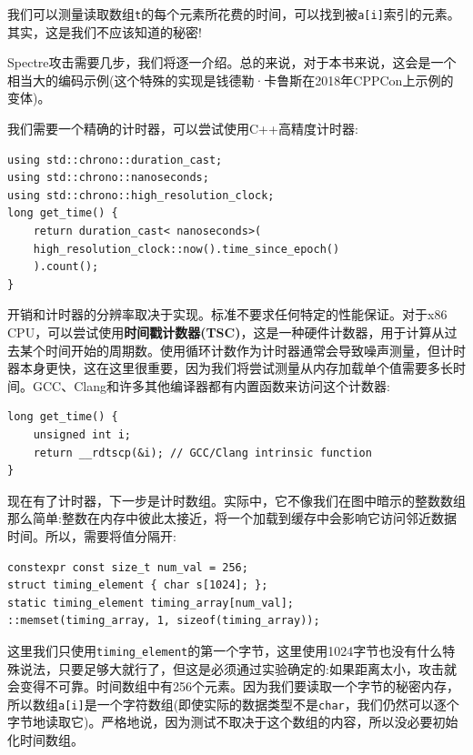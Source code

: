 我们可以测量读取数组\texttt{t}的每个元素所花费的时间，可以找到被\texttt{a[i]}索引的元素。其实，这是我们不应该知道的秘密!


Spectre攻击需要几步，我们将逐一介绍。总的来说，对于本书来说，这会是一个相当大的编码示例(这个特殊的实现是钱德勒·卡鲁斯在2018年CPPCon上示例的变体)。

我们需要一个精确的计时器，可以尝试使用C++高精度计时器:

\begin{lstlisting}[style=styleCXX]
using std::chrono::duration_cast;
using std::chrono::nanoseconds;
using std::chrono::high_resolution_clock;
long get_time() {
	return duration_cast< nanoseconds>(
	high_resolution_clock::now().time_since_epoch()
	).count();
}
\end{lstlisting}

开销和计时器的分辨率取决于实现。标准不要求任何特定的性能保证。对于x86 CPU，可以尝试使用\textbf{时间戳计数器(TSC)}，这是一种硬件计数器，用于计算从过去某个时间开始的周期数。使用循环计数作为计时器通常会导致噪声测量，但计时器本身更快，这在这里很重要，因为我们将尝试测量从内存加载单个值需要多长时间。GCC、Clang和许多其他编译器都有内置函数来访问这个计数器:

\begin{lstlisting}[style=styleCXX]
long get_time() {
	unsigned int i;
	return __rdtscp(&i); // GCC/Clang intrinsic function
}
\end{lstlisting}

现在有了计时器，下一步是计时数组。实际中，它不像我们在图中暗示的整数数组那么简单:整数在内存中彼此太接近，将一个加载到缓存中会影响它访问邻近数据时间。所以，需要将值分隔开:

\begin{lstlisting}[style=styleCXX]
constexpr const size_t num_val = 256;
struct timing_element { char s[1024]; };
static timing_element timing_array[num_val];
::memset(timing_array, 1, sizeof(timing_array));
\end{lstlisting}

这里我们只使用\texttt{timing\_element}的第一个字节，这里使用1024字节也没有什么特殊说法，只要足够大就行了，但这是必须通过实验确定的:如果距离太小，攻击就会变得不可靠。时间数组中有256个元素。因为我们要读取一个字节的秘密内存，所以数组\texttt{a[i]}是一个字符数组(即使实际的数据类型不是\texttt{char}，我们仍然可以逐个字节地读取它)。严格地说，因为测试不取决于这个数组的内容，所以没必要初始化时间数组。

